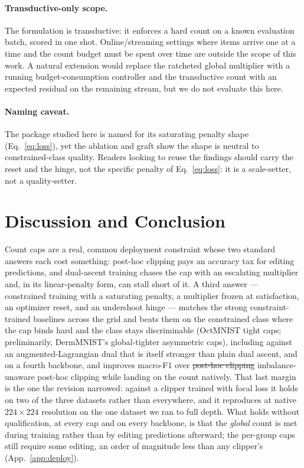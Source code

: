 \documentclass[10pt]{article}
\newcommand{\del}[1]{{\color{red}\sout{#1}}}
\begin{document}
\paragraph{Transductive-only scope.}
The formulation is transductive: it enforces a hard count on a known
evaluation batch, scored in one shot. Online/streaming settings where
items arrive one at a time and the count budget must be spent over time
are outside the scope of this work. A natural extension would replace
the ratcheted global multiplier with a running budget-consumption
controller and the transductive count with an expected residual on the
remaining stream, but we do not evaluate this here.

\paragraph{Naming caveat.}
The package studied here is named for its saturating penalty shape
(Eq.~\eqref{eq:loss}), yet the ablation and graft show the shape is
neutral to constrained-class quality. Readers looking to reuse the
findings should carry the reset and the hinge, not the specific penalty
of Eq.~\eqref{eq:loss}: it is a scale-setter, not a quality-setter.

\section{Discussion and Conclusion}
\label{sec:conclusion}

Count caps are a real, common deployment constraint whose two standard
answers each cost something: post-hoc clipping pays an accuracy tax for
editing predictions, and dual-ascent training chases the cap with an
escalating multiplier and, in its linear-penalty form, can stall short of
it. A third answer --- constrained training with a saturating penalty, a
multiplier frozen at satisfaction, an optimizer reset, and an undershoot
hinge --- matches the strong constraint-trained baselines across the grid
and beats them on the constrained class where the cap binds hard and the
class stays discriminable (OctMNIST tight caps; preliminarily,
DermMNIST's global-tighter asymmetric caps),{\color{blue} including against an
augmented-Lagrangian dual that is itself stronger than plain dual ascent, and on a
fourth backbone,} and improves macro-F1 over
\del{post-hoc clipping}{\color{blue} imbalance-unaware post-hoc clipping}
while landing on the count natively.{\color{blue} That last margin is the one the
revision narrowed: against a clipper trained with focal loss it holds on two of the
three datasets rather than everywhere, and it reproduces at native
$224{\times}224$ resolution on the one dataset we ran to full depth. What holds
without qualification, at every cap and on every backbone, is that the
{\color{blue}\emph{global}} count is met
during training rather than by editing predictions afterward{\color{blue}; the
per-group caps still require some editing, an order of magnitude less than any
clipper's (App.~\ref{app:deploy})}.}
\end{document}
